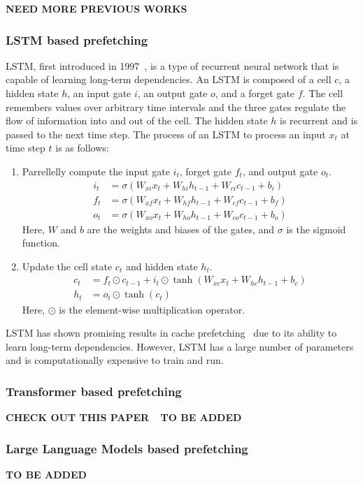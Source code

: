 \textbf{NEED MORE PREVIOUS WORKS}

\subsubsection{LSTM based prefetching}

LSTM, first introduced in 1997~\cite{LSTM}, is a type of recurrent neural network that is capable of learning long-term dependencies. An LSTM is composed of a cell $c$, a hidden state $h$, an input gate $i$, an output gate $o$, and a forget gate $f$. The cell remembers values over arbitrary time intervals and the three gates regulate the flow of information into and out of the cell. The hidden state $h$ is recurrent and is passed to the next time step. The process of an LSTM to process an input $x_t$ at time step $t$ is as follows:

\begin{enumerate}
    \item Parrellelly compute the input gate $i_t$, forget gate $f_t$, and output gate $o_t$.\begin{align*}
        i_t &= \sigma(W_{xi}x_t + W_{hi}h_{t-1} + W_{ci}c_{t-1} + b_i)\\
        f_t &= \sigma(W_{xf}x_t + W_{hf}h_{t-1} + W_{cf}c_{t-1} + b_f)\\
        o_t &= \sigma(W_{xo}x_t + W_{ho}h_{t-1} + W_{co}c_{t-1} + b_o)
    \end{align*}
    Here, $W$ and $b$ are the weights and biases of the gates, and $\sigma$ is the sigmoid function.
    \item Update the cell state $c_t$ and hidden state $h_t$.\begin{align*}
        c_t &= f_t \odot c_{t-1} + i_t \odot \tanh(W_{xc}x_t + W_{hc}h_{t-1} + b_c)\\
        h_t &= o_t \odot \tanh(c_t)
    \end{align*}
    Here, $\odot$ is the element-wise multiplication operator.
\end{enumerate}

LSTM has shown promising results in cache prefetching~\cite{LMAP} due to its ability to learn long-term dependencies. However, LSTM has a large number of parameters and is computationally expensive to train and run. 

\subsubsection{Transformer based prefetching}

\textbf{CHECK OUT THIS PAPER}
~\cite{Twilight}
\textbf{TO BE ADDED}

\subsubsection{Large Language Models based prefetching}

\textbf{TO BE ADDED}